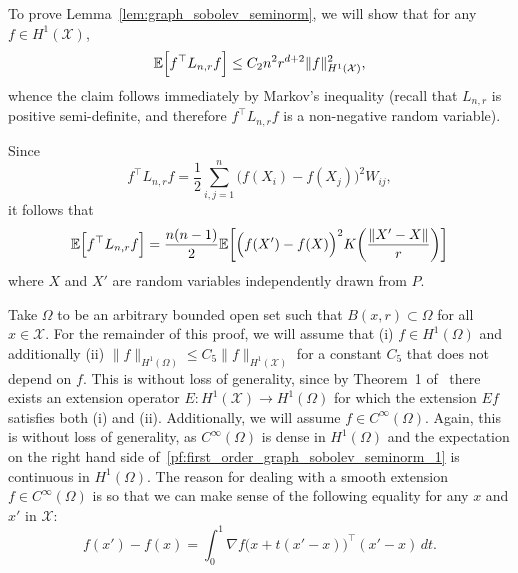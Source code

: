 \documentclass[twoside]{article}
\newcommand{\1}{\mathbf{1}}
\newcommand{\Lap}{L}
\newcommand{\Xset}{\mathcal{X}}
\newcommand{\mc}[1]{\mathcal{#1}}
\newcommand{\Ebb}{\mathbb{E}}
\theoremstyle{definition}
\theoremstyle{remark}
\begin{document}
To prove Lemma~\ref{lem:graph_sobolev_seminorm}, we will show that for any $f \in H^1(\Xset)$,
\begin{equation*}
\Ebb\Bigl[f^{\top} \Lap_{n,r} f\Bigr] \leq C_2 n^2 r^{d + 2} \|f\|_{H^1(\Xset)}^2,
\end{equation*}
whence the claim follows immediately by Markov's inequality (recall that $\Lap_{n,r}$ is positive semi-definite, and therefore $f^{\top} \Lap_{n,r} f$ is a non-negative random variable).

Since
\begin{equation*}
f^{\top} \Lap_{n,r} f = \frac{1}{2}\sum_{i, j = 1}^{n} \bigl(f(X_i) - f(X_j)\bigr)^2 W_{ij},
\end{equation*}
it follows that
\begin{equation}
\label{pf:first_order_graph_sobolev_seminorm_1}
\Ebb\Bigl[f^{\top} \Lap_{n,r} f\Bigr] = \frac{n(n - 1)}{2} \Ebb\biggl[\Bigl(f(X') - f(X)\Bigr)^2 K\biggl(\frac{\|X' - X\|}{r}\biggr)\biggr]
\end{equation}
where $X$ and $X'$ are random variables independently drawn from $P$.

Take $\Omega$ to be an arbitrary bounded open set such that $B(x,r) \subset \Omega$ for all $x \in \mc{X}$. For the remainder of this proof, we will assume that (i) $f \in H^1(\Omega)$ and additionally (ii) $\|f\|_{H^1(\Omega)} \leq C_5 \|f\|_{H^1(\mc{X})}$ for a constant $C_5$ that does not depend on $f$. This is without loss of generality, since by Theorem~1 of~\citet{evans10} there exists an extension operator $E: H^1(\mc{X}) \to H^1(\Omega)$ for which the extension $Ef$ satisfies both (i) and (ii). Additionally, we will assume $f \in C^{\infty}(\Omega)$. Again, this is without loss of generality, as $C^{\infty}(\Omega)$ is dense in $H^1(\Omega)$ and the expectation on the right hand side of~\eqref{pf:first_order_graph_sobolev_seminorm_1} is continuous in $H^1(\Omega)$. The reason for dealing with a smooth extension $f \in C^{\infty}(\Omega)$ is so that we can make sense of the following equality for any $x$ and $x'$ in $\mc{X}$:
\begin{equation}
\label{pf:first_order_graph_sobolev_seminorm_1.5}
f(x') - f(x) = \int_{0}^{1} \nabla f\bigl(x + t(x' - x)\bigr)^{\top} (x' - x) \,dt.
\end{equation}
\end{document}
